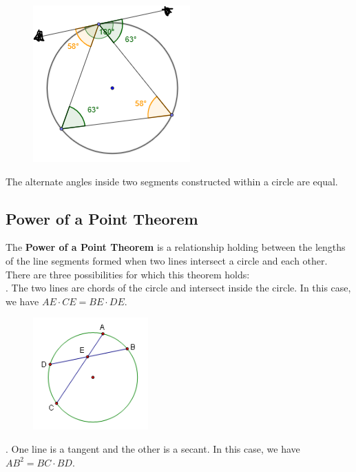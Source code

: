         \begin{figure} [hbt!]
            \centering
            \includegraphics[scale=0.75]{Resources/Unit4Circles/circle7.PNG}
        \end{figure}

        \noindent The alternate angles inside two segments constructed within a circle are equal.



    \subsection{Power of a Point Theorem}
        The \color{purple} \textbf{Power of a Point Theorem} \color{black} is a relationship
        holding between the lengths of the line segments formed when two lines intersect a circle
        and each other. There are three possibilities for which this theorem holds: \\

        . The two lines are chords of the circle and intersect inside the circle.
        In this case, we have $AE\cdot CE = BE\cdot DE$. \\

        \begin{figure} [hbt!]
            \centering
            \includegraphics[scale=0.75]{Resources/Unit4Circles/power1.PNG}
        \end{figure}

        . One line is a tangent and the other is a secant. In this case, we have
        $AB^2=BC\cdot BD$. \\


